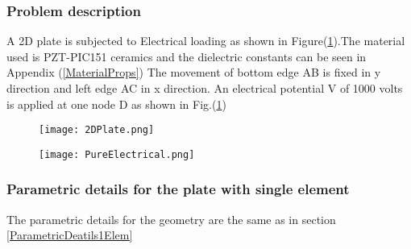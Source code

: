 \documentclass[11pt]{article}
\begin{document}
\subsubsection{Problem description}
A 2D plate is subjected to Electrical loading as shown in Figure(\ref{PureElectrical}).The material used is PZT-PIC151 ceramics and the dielectric constants can be seen in Appendix (\ref{MaterialProps})
The movement of bottom edge AB is fixed in y direction and left edge AC in x direction. An electrical potential V of 1000 volts is applied at one node D as shown in Fig.(\ref{PureElectrical})
\begin{figure}[H]
	\centering
	\begin{minipage}{.5\textwidth}
		\centering
		\texttt{[image: 2DPlate.png]}
		\label{2Dplate}
	\end{minipage}%
	\begin{minipage}{.5\textwidth}
		\centering
		\texttt{[image: PureElectrical.png]}
		\label{PureElectrical}
	\end{minipage}
\end{figure}
\subsubsection{Parametric details for the plate with single element}


The parametric details for the geometry are the same as in section \hyperref[ParametricDeatils1Elem]{\ref{ParametricDeatils1Elem}}
\end{document}
